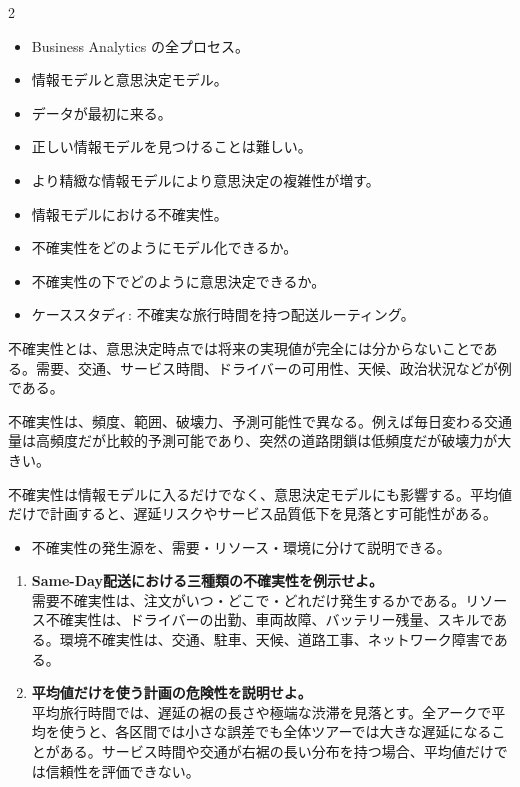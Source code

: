 \begin{multicols}{2}\footnotesize\raggedcolumns
{}
\begin{itemize}
\item Business Analytics の全プロセス。
\item 情報モデルと意思決定モデル。
\item データが最初に来る。
\item 正しい情報モデルを見つけることは難しい。
\item より精緻な情報モデルにより意思決定の複雑性が増す。
\item 情報モデルにおける不確実性。
\item 不確実性をどのようにモデル化できるか。
\item 不確実性の下でどのように意思決定できるか。
\item ケーススタディ: 不確実な旅行時間を持つ配送ルーティング。
\end{itemize}
不確実性とは、意思決定時点では将来の実現値が完全には分からないことである。需要、交通、サービス時間、ドライバーの可用性、天候、政治状況などが例である。\par

不確実性は、頻度、範囲、破壊力、予測可能性で異なる。例えば毎日変わる交通量は高頻度だが比較的予測可能であり、突然の道路閉鎖は低頻度だが破壊力が大きい。\par

不確実性は情報モデルに入るだけでなく、意思決定モデルにも影響する。平均値だけで計画すると、遅延リスクやサービス品質低下を見落とす可能性がある。\par
{}
\begin{itemize}
\item 不確実性の発生源を、需要・リソース・環境に分けて説明できる。
\end{itemize}
\begin{enumerate}
\item \textbf{Same-Day配送における三種類の不確実性を例示せよ。}\\需要不確実性は、注文がいつ・どこで・どれだけ発生するかである。リソース不確実性は、ドライバーの出勤、車両故障、バッテリー残量、スキルである。環境不確実性は、交通、駐車、天候、道路工事、ネットワーク障害である。
\item \textbf{平均値だけを使う計画の危険性を説明せよ。}\\平均旅行時間では、遅延の裾の長さや極端な渋滞を見落とす。全アークで平均を使うと、各区間では小さな誤差でも全体ツアーでは大きな遅延になることがある。サービス時間や交通が右裾の長い分布を持つ場合、平均値だけでは信頼性を評価できない。
\end{enumerate}
\end{multicols}

